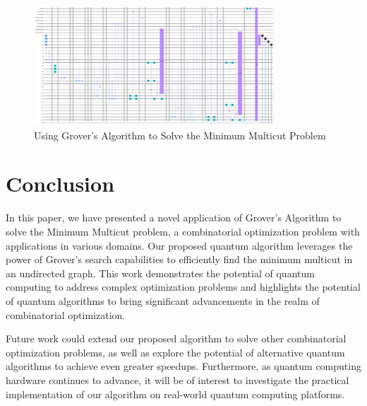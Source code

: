 \begin{figure}[htp]
    \centering
    \includegraphics[width=9cm]{Figures/Minimum_Multicut_circuit.png}
    \caption{Using Grover's Algorithm to Solve the Minimum Multicut Problem}
    \label{fig:Minimum_Multicut}
\end{figure}

\section{Conclusion}\label{sec:conclusion}

In this paper, we have presented a novel application of Grover's Algorithm to solve the Minimum Multicut problem, a combinatorial optimization problem with applications in various domains. Our proposed quantum algorithm leverages the power of Grover's search capabilities to efficiently find the minimum multicut in an undirected graph. This work demonstrates the potential of quantum computing to address complex optimization problems and highlights the potential of quantum algorithms to bring significant advancements in the realm of combinatorial optimization.

Future work could extend our proposed algorithm to solve other combinatorial optimization problems, as well as explore the potential of alternative quantum algorithms to achieve even greater speedups. Furthermore, as quantum computing hardware continues to advance, it will be of interest to investigate the practical implementation of our algorithm on real-world quantum computing platforms.

